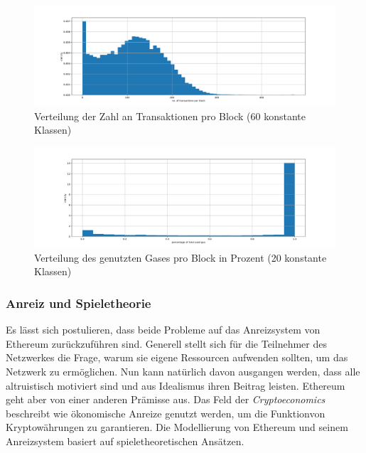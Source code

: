 \documentclass[runningheads]{llncs}
\begin{document}
\begin{figure}[h!]
  \centerline{\includegraphics[width=\textwidth, keepaspectratio]{blocks_transactions_per_block.png}}
  \caption{Verteilung der Zahl an Transaktionen pro Block (60 konstante Klassen) \cite{neemann_appendix_nodate}}
  \label{blocks_transactions_per_block}
\end{figure}

\begin{figure}[h!]
  \centerline{\includegraphics[width=\textwidth, keepaspectratio]{blocks_unused_gas.png}}
  \caption{Verteilung des genutzten Gases pro Block in Prozent (20 konstante Klassen) \cite{neemann_appendix_nodate}}
  \label{blocks_transactions_per_block}
\end{figure}


\subsubsection{Anreiz und Spieletheorie}
Es lässt sich postulieren, dass beide Probleme auf das Anreizsystem von Ethereum zurückzuführen sind. Generell stellt sich für die Teilnehmer des Netzwerkes die Frage, warum sie eigene Ressourcen aufwenden sollten, um das Netzwerk zu ermöglichen. Nun kann natürlich davon ausgangen werden, dass alle altruistisch motiviert sind und aus Idealismus ihren Beitrag leisten. Ethereum geht aber von einer anderen Prämisse aus. Das Feld der \textit{Cryptoeconomics} beschreibt wie ökonomische Anreize genutzt werden, um die Funktionvon Kryptowährungen zu garantieren. Die Modellierung von Ethereum und seinem Anreizsystem basiert auf spieletheoretischen Ansätzen. \cite{noauthor_cryptoeconomics_nodate}
\end{document}
